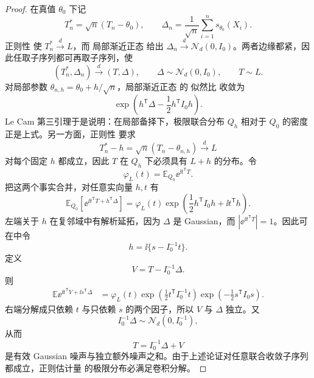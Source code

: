 \begin{proof}
在真值 $\theta_0$ 下记
\[
 T_n^*=\sqrt n(T_n-\theta_0),
 \qquad
 \Delta_n=\frac1{\sqrt n}\sum_{i=1}^ns_{\theta_0}(X_i).
\]
正则性 使 $T_n^*\xrightarrow{d} L$，而 局部渐近正态 给出 $\Delta_n\xrightarrow{d}\mathcal N_d(0,I_0)$。两者边缘都紧，因此任取子序列都可再取子序列，使
\[
 (T_n^*,\Delta_n)\xrightarrow{d}(T,\Delta),
 \qquad
 \Delta\sim\mathcal N_d(0,I_0),
 \qquad
 T\sim L.
\]
对局部参数 $\theta_{n,h}=\theta_0+h/\sqrt n$，局部渐近正态 的 似然比 收敛为
\[
 \exp\!\left(h^{\mathsf T}\Delta-
 \frac12h^{\mathsf T}I_0h\right).
\]
Le Cam 第三引理于是说明：在局部备择下，极限联合分布 $Q_h$ 相对于 $Q_0$ 的密度正是上式。另一方面，正则性 要求
\[
 T_n^*-h
 =\sqrt n(T_n-\theta_{n,h})
 \xrightarrow{d} L
\]
对每个固定 $h$ 都成立，因此 $T$ 在 $Q_h$ 下必须具有 $L+h$ 的分布。令
\[
 \varphi_L(t)=\mathbb E_{Q_0}\ee^{\ii t^{\mathsf T}T}.
\]
把这两个事实合并，对任意实向量 $h,t$ 有
\begin{equation}\label{eq:math-stat-convolution-transform-identity}
 \mathbb E_{Q_0}\!\left[
 \ee^{\ii t^{\mathsf T}T+h^{\mathsf T}\Delta}
 \right]
 =\varphi_L(t)
 \exp\!\left(
 \frac12h^{\mathsf T}I_0h
 +\ii t^{\mathsf T}h
 \right).
\end{equation}
左端关于 $h$ 在复邻域中有解析延拓，因为 $\Delta$ 是 Gaussian，而 $|\ee^{\ii t^{\mathsf T}T}|=1$。因此可在中令
\[
 h=\ii\{s-I_0^{-1}t\}.
\]
定义
\[
 V=T-I_0^{-1}\Delta.
\]
则
\begin{align*}
 \mathbb E\ee^{\ii t^{\mathsf T}V+\ii s^{\mathsf T}\Delta}
 &=\varphi_L(t)
 \exp\!\left(\frac12t^{\mathsf T}I_0^{-1}t\right)
 \exp\!\left(-\frac12s^{\mathsf T}I_0s\right).
\end{align*}
右端分解成只依赖 $t$ 与只依赖 $s$ 的两个因子，所以 $V$ 与 $\Delta$ 独立。又
\[
 I_0^{-1}\Delta\sim\mathcal N_d(0,I_0^{-1}),
\]
从而
\[
 T=I_0^{-1}\Delta+V
\]
是有效 Gaussian 噪声与独立额外噪声之和。由于上述论证对任意联合收敛子序列都成立，正则估计量 的极限分布必满足卷积分解。
\end{proof}


